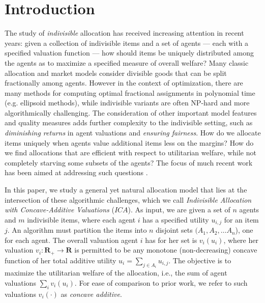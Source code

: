 \section{Introduction}
\label{sec:intro}

The study of {\em indivisible} allocation has received increasing attention in recent years: given a collection of indivisible items and a set of agents --- each with a specified valuation function --- how should items be uniquely distributed among the agents as to maximize a specified measure of overall welfare? 
Many classic allocation and market models consider divisible goods that can be split fractionally among agents. However in the context of optimization,  there are many methods for computing optimal fractional assignments in polynomial time (e.g. ellipsoid methods), while indivisible variants are often NP-hard and  more algorithmically challenging.  
The consideration of other important model features and quality measures adds further complexity to the indivisible setting, such as {\em diminishing returns} in agent valuations and {\em ensuring fairness}. 
How do we allocate items uniquely when agents value additional items less on the margins? 
How do we find allocations that are efficient with respect to utilitarian welfare, while not completely starving some subsets of the agents? 
The focus of much recent work has been aimed at addressing such questions \cite{anari2018nash, barman2018finding, chakrabarty2010approximability, garg2018approximating, kalaitzis2015configuration,li2021constant}.

In this paper, we study a general yet natural allocation model that lies at the intersection of these algorithmic challenges, which we call {\em Indivisible Allocation with Concave-Additive Valuations} ($ICA$).
As input, we are given a set of $n$ agents and $m$ indivisible items, where each agent $i$ has a specified utility $u_{i,j}$ for an item $j$. An algorithm must partition the items into $n$ disjoint sets $(A_1, A_2, \ldots A_n$), one for each agent. The overall valuation agent $i$ has for her set is  $v_i(u_i)$, where her valuation $v_i: {\mathbf R}_{+} \rightarrow {\mathbf R}$ is permitted to be any monotone (non-decreasing) concave function of her total additive utility $u_i = \sum_{j \in A_i} u_{i,j}$. The objective is to maximize the utilitarian welfare of the allocation, i.e., the sum of agent valuations $\sum_iv_i( u_{i})$.  For ease of comparison to prior work, we refer to such valuations $v_i(\cdot)$ as {\em concave additive}.

